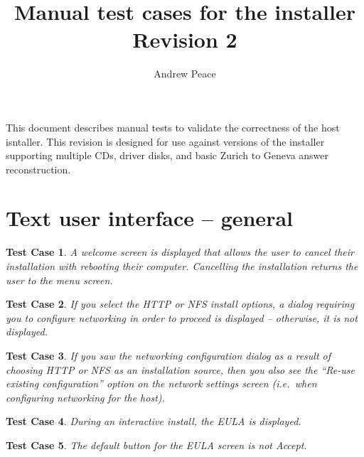 \documentclass[a4paper]{article}
\newtheorem{testcase}{Test Case}
\begin{document}
\title{Manual test cases for the installer \\  Revision 2}
\author{Andrew Peace}
\date{}

\maketitle

This document describes manual tests to validate the correctness of
the host isntaller.  This revision is designed for use against
versions of the installer supporting multiple CDs, driver disks, and
basic Zurich to Geneva answer reconstruction.

\section{Text user interface -- general}

\begin{testcase}
A welcome screen is displayed that allows the user to cancel their
installation with rebooting their computer.  Cancelling the
installation returns the user to the menu screen.
\end{testcase}

\begin{testcase}
If you select the HTTP or NFS install options, a dialog requiring you
to configure networking in order to proceed is displayed -- otherwise,
it is not displayed.
\end{testcase}

\begin{testcase}
If you saw the networking configuration dialog as a result of choosing
HTTP or NFS as an installation source, then you also see the ``Re-use
existing configuration'' option on the network settings screen
(i.e.\ when configuring networking for the host).
\end{testcase}

\begin{testcase}
During an interactive install, the EULA is displayed.
\end{testcase}

\begin{testcase}
The default button for the EULA screen is not Accept.
\end{testcase}
\end{document}
